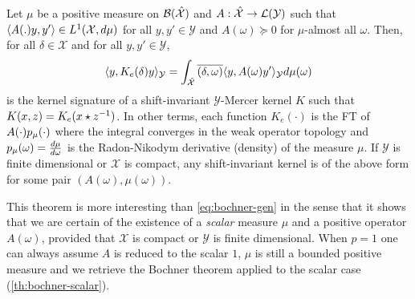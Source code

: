 \begin{proposition}\label{pr:mercer_kernel_bochner}
Let $\mu$ be a positive measure on $\mathcal{B}(\mathcal{\hat{\mathcal{X}}})$ and $A: \hat{\mathcal{X}}\to \mathcal{L}(\mathcal{Y})$ such that $\langle A(.)y,y'\rangle\in L^1(\mathcal{X},d\mu)$ for all $y,y'\in\mathcal{Y}$ and $A(\omega)\succcurlyeq 0$ for $\mu$-almost all $\omega$. Then, for all $\delta \in \mathcal{X}$ and for all $y, y' \in \mathcal{Y}$,
\begin{equation}
\label{eq:AK0}
\langle y,K_e(\delta)y\rangle_{\mathcal{Y}}=\int_{\hat{\mathcal{X}}}\overline{(\delta,\omega)}\langle y,A(\omega)y'\rangle_{\mathcal{Y}}d\mu(\omega)
\end{equation}
is the kernel signature of a shift-invariant $\mathcal{Y}$-Mercer kernel $K$ such that $K(x,z)=K_e(x \star {z}^{-1})$. In other terms, each function $K_e(\cdot)$ is the \acl{FT} of $A(\cdot)p_{\mu}(\cdot)$ where the integral converges in the weak operator topology and $p_{\mu}(\omega)=\frac{d\mu}{d\omega}$ is the Radon-Nikodym derivative (density) of the measure $\mu$. If $\mathcal{Y}$ is finite dimensional or $\mathcal{X}$ is compact, any shift-invariant kernel is of the above form for some pair $(A(\omega),\mu (\omega))$. 
\end{proposition}
This theorem is more interesting than \cref{eq:bochner-gen} in the sense that it shows that we are certain of the existence of a \emph{scalar} measure $\mu$ and a positive operator $A(\omega)$, provided that $\mathcal{X}$ is compact or $\mathcal{Y}$ is finite dimensional. When $p=1$ one can always assume $A$ is reduced to the scalar $1$, $\mu$ is still a bounded positive measure and we retrieve the Bochner theorem applied to the scalar case (\cref{th:bochner-scalar}).
